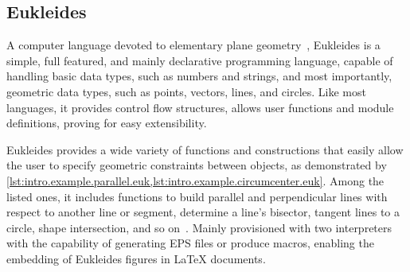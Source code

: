\subsection{Eukleides}%
\label{sec:related.constraints.eukleides}

A computer language devoted to elementary plane geometry~\cite{Obrecht:2010:EM},
Eukleides is a simple, full featured, and mainly declarative programming
language, capable of handling basic data types, such as numbers and strings, and
most importantly, geometric data types, such as points, vectors, lines, and
circles.  Like most languages, it provides control flow structures, allows user
functions and module definitions, proving for easy extensibility.

Eukleides provides a wide variety of functions and constructions that easily
allow the user to specify geometric constraints between objects, as demonstrated
by \cref{lst:intro.example.parallel.euk,lst:intro.example.circumcenter.euk}.
Among the listed ones, it includes functions to build parallel and perpendicular
lines with respect to another line or segment, determine a line's bisector,
tangent lines to a circle, shape intersection, and so on~\cite{Obrecht:2010:EM}.
Mainly provisioned with two interpreters with the capability of generating
\ac{EPS} files or produce macros, enabling the embedding of Eukleides figures in
\LaTeX{} documents.


